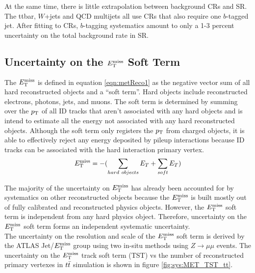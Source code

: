 \indent At the same time, there is little extrapolation between background CRs and SR. The ttbar, $W$+jets and QCD multijets all use CRs that also require one $b$-tagged jet.  After fitting to CRs, $b$-tagging systematics amount to only a 1-3 percent uncertainty on the total background rate in SR.  \\

\subsection{Uncertainty on the $E_{\mathrm{T}}^{\mathrm{miss}}$ Soft Term}

\indent The $E_{\mathrm{T}}^{\mathrm{miss}}$ is defined in equation \ref{eqn:metReco1} as the negative vector sum of all hard reconstructed objects and a ``soft term''.  Hard objects include reconstructed electrons, photons, jets, and muons.  The soft term is determined by summing over the $p_{\mathrm{T}}$ of all ID tracks that aren't associated with any hard objects and is intend to estimate all the energy not associated with any hard reconstructed objects.  Although the soft term only registers the $p_{\mathrm{T}}$ from charged objects, it is able to effectively reject any energy deposited by pileup interactions because ID tracks can be associated with the hard interaction primary vertex. \\

\begin{equation}
E_{\mathrm{T}}^{\mathrm{miss}} = - ( \sum_{hard~objects} E_T + \sum_{soft} E_T ) 
\label{eqn:metReco1}
\end{equation}

\indent  The majority of the uncertainty on $E_{\mathrm{T}}^{\mathrm{miss}}$ has already been accounted for by systematics on other reconstructed objects because the $E_{\mathrm{T}}^{\mathrm{miss}}$ is built mostly out of fully calibrated and reconstructed physics objects.  However, the $E_{\mathrm{T}}^{\mathrm{miss}}$ soft term is independent from any hard physics object.  Therefore, uncertainty on the $E_{\mathrm{T}}^{\mathrm{miss}}$ soft term forms an independent systematic uncertainty.  \\

\indent The uncertainty on the resolution and scale of the $E_{\mathrm{T}}^{\mathrm{miss}}$ soft term is derived by the ATLAS Jet/$E_{\mathrm{T}}^{\mathrm{miss}}$ group using two in-situ methods using $Z\rightarrow \mu\mu$ events.\cite{METPerform} The uncertainty on the $E_{\mathrm{T}}^{\mathrm{miss}}$ track soft term (TST) vs the number of reconstructed primary vertexes in $t\bar{t}$ simulation is shown in figure \ref{fig:sys:MET_TST_tt}. \\

